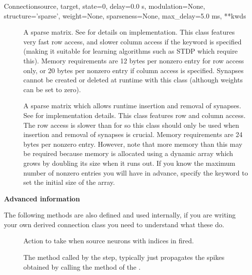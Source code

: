 \documentclass[letterpaper,10pt,english]{manual}
\begin{document}
\begin{classdesc}{Connection}{source, target, state=0, delay=0.0 s, modulation=None, structure='sparse', weight=None, sparseness=None, max\_delay=5.0 ms, **kwds}
\begin{description}
\item[] \leavevmode
A sparse matrix. See \hyperlink{brian.SparseConnectionMatrix}{} for
details on implementation. This class features very fast row
access, and slower column access if the 
keyword is specified (making it suitable for learning
algorithms such as STDP which require this). Memory
requirements are 12 bytes per nonzero entry for row access
only, or 20 bytes per nonzero entry if column access is
specified. Synapses cannot be created or deleted at runtime
with this class (although weights can be set to zero).

\item[] \leavevmode
A sparse matrix which allows runtime insertion and removal
of synapses. See \hyperlink{brian.DynamicConnectionMatrix}{} for
implementation details. This class features row and column
access. The row access is slower than for  so this
class should only be used when insertion and removal of
synapses is crucial. Memory requirements are 24 bytes per
nonzero entry. However, note that more memory than this
may be required because memory is allocated using a
dynamic array which grows by doubling its size when it runs
out. If you know the maximum number of nonzero entries you will
have in advance, specify the  keyword to set the
initial size of the array.

\end{description}

\textbf{Advanced information}

The following methods are also defined and used internally, if you are
writing your own derived connection class you need to understand what
these do.
\begin{description}
\item[] \leavevmode
Action to take when source neurons with indices in 
fired.

\item[] \leavevmode
The method called by the \hyperlink{brian.Network}{}  step,
typically just propagates the spikes obtained by calling
the  method of the  \hyperlink{brian.NeuronGroup}{}.

\end{description}
\end{classdesc}
\end{document}
